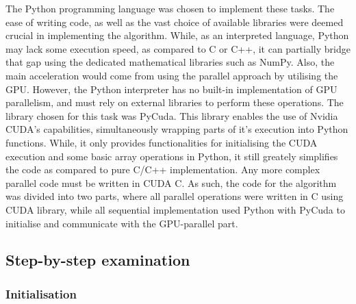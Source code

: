 \documentclass[12pt, oneside]{report}
\begin{document}
The Python programming language was chosen to implement these tasks. The ease of writing code, as well as the vast choice of available libraries were deemed crucial in implementing the algorithm. While, as an interpreted language, Python may lack some execution speed, as compared to C or C++, it can partially bridge that gap using the dedicated mathematical libraries such as NumPy. Also, the main acceleration would come from using the parallel approach by utilising the GPU\cite{numpy}. \newline
However, the Python interpreter has no built-in implementation of GPU parallelism, and must rely on external libraries to perform these operations. The library chosen for this task was PyCuda. This library enables the use of Nvidia CUDA's capabilities, simultaneously wrapping parts of it's execution into Python functions. While, it only provides functionalities for initialising the CUDA execution and some basic array operations in Python, it still greately simplifies the code as compared to pure C/C++ implementation. Any more complex parallel code must be written in CUDA C. As such, the code for the algorithm was divided into two parts, where all parallel operations were written in C using CUDA library, while all sequential implementation used Python with PyCuda to initialise and communicate with the GPU-parallel part\cite{pycuda}.


\subsection{Step-by-step examination}

\subsubsection{Initialisation}
\end{document}
